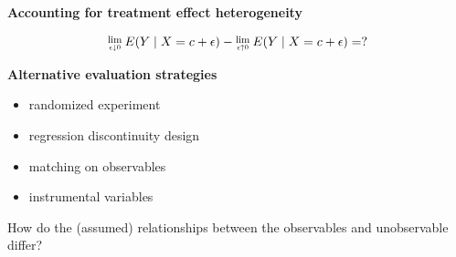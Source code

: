 \begin{frame}\textbf{Accounting for treatment effect heterogeneity}\vspace{0.3cm}

\begin{align*}
\Lim{\epsilon \downarrow 0} E(Y\mid X = c + \epsilon) -
\Lim{\epsilon \uparrow 0} E(Y\mid X = c + \epsilon) = ?
\end{align*}

\end{frame}
\begin{frame}\textbf{Alternative evaluation strategies}\vspace{0.3cm}

\begin{itemize}\setlength\itemsep{1em}
\item randomized experiment
\item regression discontinuity design
\item matching on observables
\item instrumental variables\vspace{0.3cm}
\end{itemize}

How do the (assumed) relationships between the observables and unobservable differ?

\end{frame}
\begin{frame}

\begin{figure}[htp]\centering
{}
\end{figure}

\end{frame}
